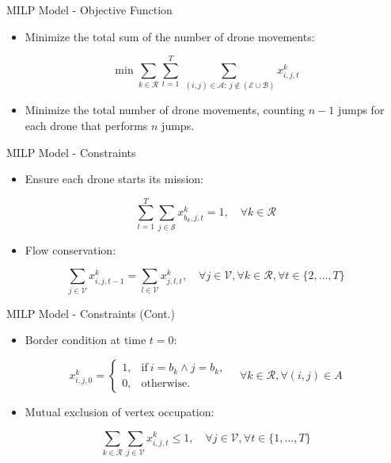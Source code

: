 \begin{frame}{MILP Model - Objective Function}
    \begin{itemize}
        \item Minimize the total sum of the number of drone movements:
    \end{itemize}
    \[
    \min
    \sum_{k \in \mathcal{R}}
    \sum_{t=1}^T
    \sum_{ \; (i,j) \in \mathcal{A}:\ j \notin (\mathcal{E} \cup \mathcal{B})} x_{i,j,t}^{k}
    \]
    \begin{itemize}
        \item Minimize the total number of drone movements, counting $n-1$ jumps for each drone that performs $n$ jumps.
    \end{itemize}
\end{frame}

\begin{frame}{MILP Model - Constraints}
    \begin{itemize}
        \item Ensure each drone starts its mission:
    \end{itemize}
    \[
    \sum_{t=1}^{T}
    \sum_{j \in \mathcal{S}}
    x_{b_k,j,t}^k = 1, \quad \forall k \in \mathcal{R}
    \]
    \begin{itemize}
        \item Flow conservation:
    \end{itemize}
    \[
    \sum_{j \in \mathcal{V}} x_{i,j,t-1}^{k} =
    \sum_{l \in \mathcal{V}} x_{j,l,t}^{k}, \quad
    \forall j \in \mathcal{V}, \forall k \in \mathcal{R}, \forall t \in \{2, \ldots, T\}
    \]
\end{frame}

\begin{frame}{MILP Model - Constraints (Cont.)}
    \begin{itemize}
        \item Border condition at time $t=0$:
    \end{itemize}
    \[
    x_{i,j,0}^k = \left\{
    \begin{matrix}
        1, & \text{if}\ i=b_k \land j=b_k,\\
        0, & \text{otherwise}.
    \end{matrix}
    \right.
    \quad \forall k \in \mathcal{R}, \forall (i,j) \in A
    \]
    \begin{itemize}
        \item Mutual exclusion of vertex occupation:
    \end{itemize}
    \[
    \sum_{k \in \mathcal{R}}
    \sum_{j \in \mathcal{V}}
    x_{i,j,t}^{k} \leq 1, \quad \forall j \in \mathcal{V}, \forall t \in \{1, \ldots, T\}
    \]
\end{frame}


